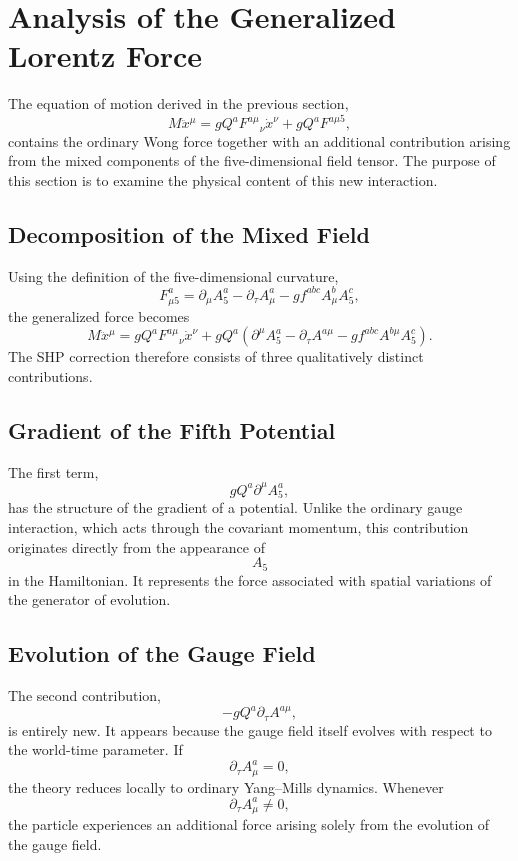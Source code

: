 \section{Analysis of the Generalized Lorentz Force}
The equation of motion derived in the previous section,
\[M\ddot x^\mu=gQ^aF^{a\mu}{}_{\nu}\dot x^\nu+gQ^aF^{a\mu5},\]
contains the ordinary Wong force together with an additional
contribution arising from the mixed components of the five-dimensional
field tensor.
The purpose of this section is to examine the physical content of this
new interaction.
\subsection{Decomposition of the Mixed Field}
Using the definition of the five-dimensional curvature,
\[F_{\mu5}^a=\partial_\mu A_5^a-\partial_\tau A_\mu^a-gf^{abc}A_\mu^bA_5^c,\]
the generalized force becomes
\[M\ddot x^\mu=gQ^aF^{a\mu}{}_{\nu}\dot x^\nu+gQ^a
\left(\partial^\mu A_5^a-\partial_\tau A^{a\mu}-gf^{abc}A^{b\mu}A_5^c\right).\]
The SHP correction therefore consists of three qualitatively distinct
contributions.
\subsection{Gradient of the Fifth Potential}
The first term,
\[gQ^a\partial^\mu A_5^a,\]
has the structure of the gradient of a potential.
Unlike the ordinary gauge interaction,
which acts through the covariant momentum,
this contribution originates directly from the appearance of
\[A_5\]
in the Hamiltonian.
It represents the force associated with spatial variations of the
generator of evolution.
\subsection{Evolution of the Gauge Field}
The second contribution,
\[-gQ^a\partial_\tau A^{a\mu},\]
is entirely new.
It appears because the gauge field itself evolves with respect to the
world-time parameter.
If
\[\partial_\tau A_\mu^a=0,\]
the theory reduces locally to ordinary Yang--Mills dynamics.
Whenever
\[\partial_\tau A_\mu^a\neq0,\]
the particle experiences an additional force arising solely from the
evolution of the gauge field.
